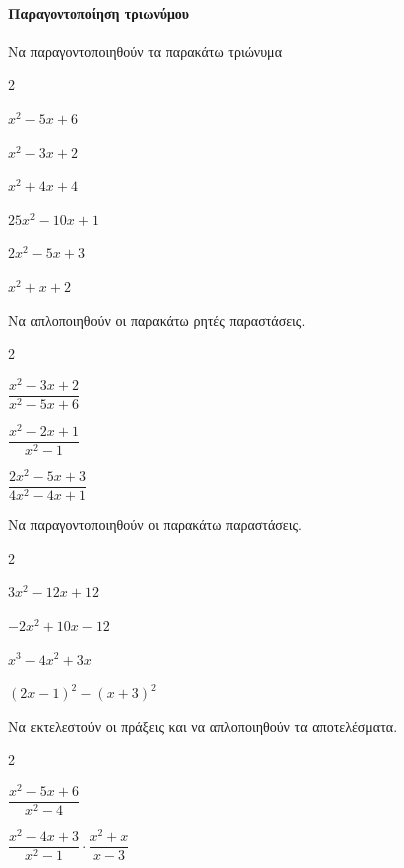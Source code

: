 \documentclass[11pt,a4paper,modern]{FFExercises}
\begin{document}
\paragraph{Παραγοντοποίηση τριωνύμου}
\askhsh Να παραγοντοποιηθούν τα παρακάτω τριώνυμα
\begin{multicols}{2}
\begin{alist}
\item $ x^2-5x+6 $
\item $ x^2-3x+2 $
\item $ x^2+4x+4 $
\item $ 25x^2-10x+1 $
\item $ 2x^2-5x+3 $
\item $ x^2+x+2 $
\end{alist}
\end{multicols}
\askhsh Να απλοποιηθούν οι παρακάτω ρητές παραστάσεις.
\begin{multicols}{2}
\begin{alist}
\item $ \dfrac{x^2-3x+2}{x^2-5x+6} $
\item $ \dfrac{x^2-2x+1}{x^2-1} $
\item $ \dfrac{2x^2-5x+3}{4x^2-4x+1} $
\end{alist}
\end{multicols}
\askhsh Να παραγοντοποιηθούν οι παρακάτω παραστάσεις.
\begin{multicols}{2}
\begin{alist}
\item $ 3x^2-12x+12 $
\item $ -2x^2+10x-12 $
\item $ x^3-4x^2+3x $
\item $ (2x-1)^2 - (x+3)^2 $
\end{alist}
\end{multicols}
\askhsh Να εκτελεστούν οι πράξεις και να απλοποιηθούν τα αποτελέσματα.
\begin{multicols}{2}
\begin{alist}
\item $ \dfrac{x^2-5x+6}{x^2-4} $
\item $ \dfrac{x^2-4x+3}{x^2-1} \cdot \dfrac{x^2+x}{x-3} $
\end{alist}
\end{multicols}
\end{document}
